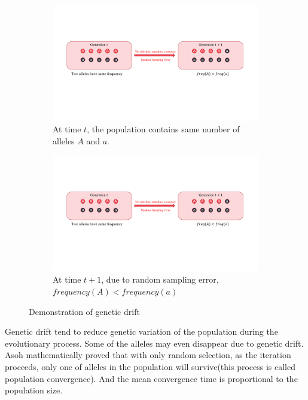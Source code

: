 \documentclass[conference]{IEEEtran}
\begin{document}
\begin{figure}[htbp]
	\centering
	\begin{subfigure}[b]{.3\textwidth}
		\includegraphics[width=\linewidth]{Section2/Generation_t}
		\caption{At time $t$, the population contains same number of alleles $A$ and $a$.}
	\end{subfigure}
	
	\begin{subfigure}[b]{.3\textwidth}
		\includegraphics[width=\linewidth]{Section2/Generation_t1}
		\caption{At time $t+1$, due to random sampling error, $frequency(A) < frequency(a)$}
	\end{subfigure}
	\caption{Demonstration of genetic drift}
	\label{fig:Genetic drift demo}
\end{figure}

Genetic drift tend to reduce genetic variation of the population during the evolutionary process. Some of the alleles may even disappear due to genetic drift. Asoh\cite{Asoh} mathematically proved that with only random selection, as the iteration proceeds, only one of alleles in the population will survive(this process is called population convergence). And the mean convergence time is proportional to the population size. 
\end{document}
